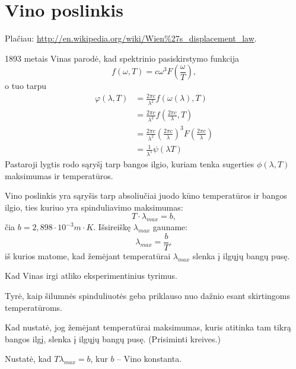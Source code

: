 \section{Vino poslinkis}

Plačiau: \url{http://en.wikipedia.org/wiki/Wien\%27s_displacement_law}.

1893 metais Vinas parodė, kad spektrinio pasiskirstymo funkcija
\begin{equation*}
  f(\omega, T) = c \omega^{3} F \left( \frac{\omega}{T} \right),
\end{equation*}
o tuo tarpu
\begin{align*}
  \varphi(\lambda, T)
  &= \frac{2 \pi c}{\lambda^{2}} f(\omega(\lambda), T) \\
  &= \frac{2 \pi c}{\lambda^{2}}
    f\left( \frac{2\pi c}{\lambda}, T \right) \\
  &= \frac{2 \pi c}{\lambda^{2}} \left( \frac{2 \pi c}{\lambda} \right)^{3}
    F\left( \frac{2\pi c}{\lambda} \right) \\
  &= \frac{1}{\lambda^{5}} \psi\left( \lambda T \right)
\end{align*}
Pastaroji lygtis rodo sąryšį tarp bangos ilgio, kuriam tenka
sugerties $\phi(\lambda, T)$ maksimumas ir temperatūros.

Vino poslinkis yra sąryšis tarp absoliučiai juodo kūno temperatūros ir
bangos ilgio, ties kuriuo yra spinduliavimo maksimumas:
\begin{equation*}
  T\cdot \lambda_{max} = b,
\end{equation*}
čia $b = 2,898 \cdot 10^{-3} m\cdot K$. Išsireiškę $\lambda_{max}$
gauname:
\begin{equation*}
  \lambda_{max} = \frac{b}{T},
\end{equation*}
iš kurios matome, kad žemėjant temperatūrai $\lambda_{max}$ slenka
į ilgųjų bangų pusę.

\begin{remember}
  \item Kad Vinas irgi atliko eksperimentinius tyrimus.
  \item Tyrė, kaip šilumnės spinduliuotės geba priklauso nuo dažnio esant
    skirtingoms temperatūroms.
  \item Kad nustatė, jog žemėjant temperatūrai maksimumas, kuris atitinka
    tam tikrą bangos ilgį, slenka į ilgųjų bangų pusę. (Prisiminti
    kreives.)
  \item Nustatė, kad $T\lambda_{max} = b$, kur $b$ – Vino konstanta.
\end{remember}

